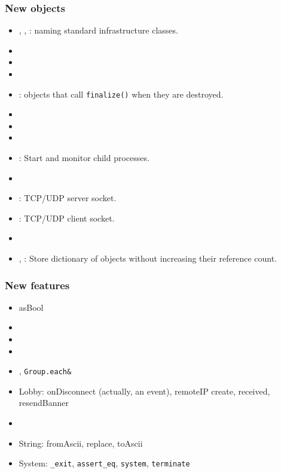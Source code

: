 \subsubsection{New objects}
\begin{itemize}
\item {}, , :
  naming standard infrastructure classes.
\item {}
\item {}
\item {}
\item {}: objects that call
  \lstinline|finalize()| when they are destroyed.
\item {}
\item {}
\item {}
\item {}: Start and monitor child processes.
\item {}
\item {}: TCP/UDP server socket.
\item {}: TCP/UDP client socket.
\item {}
\item {}, : Store
  dictionary of objects without increasing their reference count.
\end{itemize}

\subsubsection{New features}
\begin{itemize}
\item asBool
\item {}
\item {}
\item {}
\item {}, \lstinline|Group.each&|
\item Lobby: onDisconnect (actually, an event), remoteIP
  create, received, resendBanner
\item {}
\item String: fromAscii, replace, toAscii
\item System: \lstinline|_exit|, \lstinline|assert_eq|,
  \lstinline|system|, \lstinline|terminate|
\end{itemize}

